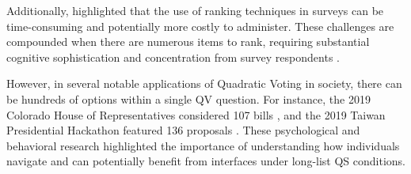 Additionally, \textcite{alwinMeasurementValuesSurveys1985} highlighted that the use of ranking techniques in surveys can be time-consuming and potentially more costly to administer. These challenges are compounded when there are numerous items to rank, requiring substantial cognitive sophistication and concentration from survey respondents \cite{featherMeasurementValuesEffects1973}.

However, in several notable applications of Quadratic Voting in society, there can be hundreds of options within a single QV question. For instance, the 2019 Colorado House of Representatives considered 107 bills \cite{coyNewWayVoting2019}, and the 2019 Taiwan Presidential Hackathon featured 136 proposals \cite{QuadraticVotingFrontend2022}. These psychological and behavioral research highlighted the importance of understanding how individuals navigate and can potentially benefit from interfaces under long-list QS conditions.


